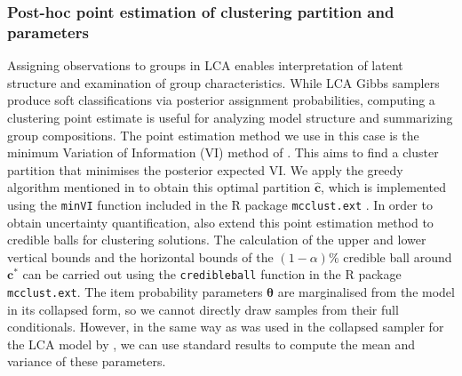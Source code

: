 \documentclass[11pt]{article}
\def\boldc{\mathbf{c}}
\def\bsthet{\boldsymbol{\theta}}
\theoremstyle{plain}
\theoremstyle{definition}
\begin{document}
\subsubsection{Post-hoc point estimation of clustering partition and parameters}\label{subsubsec:clust_point_est}
Assigning observations to groups in LCA enables interpretation of latent structure and examination of group characteristics. While LCA Gibbs samplers produce soft classifications via posterior assignment probabilities, computing a clustering point estimate is useful for analyzing model structure and summarizing group compositions.
The point estimation method we use in this case is the minimum Variation of Information (VI) method of \citet{wade_bayesian_2018}. This aims to find a cluster partition that minimises the posterior expected VI. We apply the greedy algorithm mentioned in \citet{wade_bayesian_2018} to obtain this optimal partition $\widehat{\boldc}$, which is implemented using the \verb|minVI| function included in the R package \verb|mcclust.ext| \citep{wade_mcclustext_2015}. In order to obtain uncertainty quantification, \citet{wade_bayesian_2018} also extend this point estimation method to credible balls for clustering solutions.  
The calculation of the upper and lower vertical bounds and the horizontal bounds of the $(1-\alpha)\%$ credible ball around $\boldc^*$ can be carried out using the \verb|credibleball| function in the R package \verb|mcclust.ext|. The item probability parameters $\bsthet$ are marginalised from the model in its collapsed form, so we cannot directly draw samples from their full conditionals. However, in the same way as was used in the collapsed sampler for the LCA model by \citet{white_bayesian_2016}, we can use standard results to compute the mean and variance of these parameters.
\end{document}

